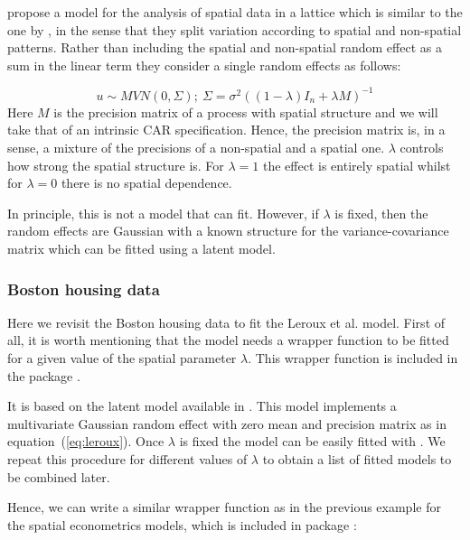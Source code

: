 \documentclass[article]{jss}
\begin{document}
\citet{Lerouxetal:1999} propose a model for the analysis of spatial data in a
lattice which is similar to the one by \citet{besagetal:1991}, in the sense
that they split variation according to  spatial and non-spatial patterns.
Rather than including the spatial and non-spatial random effect as a sum in the
linear term they consider a single random effects as follows:

\begin{equation}
u \sim MVN(0, \Sigma);\ \Sigma=\sigma^2 ((1-\lambda) I_n+\lambda M)^{-1}
\label{eq:leroux}
\end{equation}
\noindent
Here $M$ is the precision matrix of a process with spatial structure and we
will take that of an intrinsic CAR specification. Hence, the precision matrix
is, in a sense, a mixture of the precisions of a non-spatial and a spatial
one. $\lambda$ controls how strong the spatial structure is. For $\lambda=1$
the effect is entirely spatial whilst for $\lambda=0$ there is no spatial
dependence.

In principle, this is not a model that  can fit. However, if
$\lambda$ is fixed, then the random effects are Gaussian with a known structure
for the variance-covariance matrix which can be fitted using a 
latent model.

\subsubsection{Boston housing data}

Here we revisit the Boston housing data to fit the Leroux et al. model.  First
of all, it is worth mentioning that the model needs a wrapper function to be
fitted for a given value of the spatial parameter $\lambda$. This
wrapper function is included in the  package .

It is based on the  latent model available in  .
This model implements a multivariate Gaussian random effect with zero mean and
precision matrix as in equation~(\ref{eq:leroux}). Once $\lambda$ is fixed the
model can be easily fitted with .  We repeat this procedure for
different values of $\lambda$ to obtain a list of fitted models to be combined
later.

Hence, we can write a similar wrapper function as in the previous example for
the spatial econometrics models, which is included in package :
\end{document}
